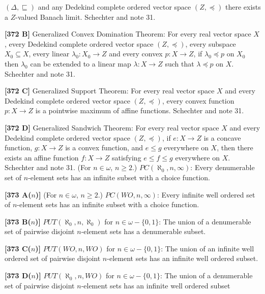 $(\Delta,\sqsubseteq)$ and any Dedekind complete ordered vector
space $(Z,\preccurlyeq)$ there exists a $Z$-valued Banach limit.
\ac{Schechter} \cite{1996b} and note 31.
\smallskip
\item{}{\bf [372 B]} Generalized Convex Domination Theorem:
For every real vector space
$X$, every Dedekind complete ordered vector space $(Z,\preccurlyeq)$,
every subspace $X_0\subseteq X$, every linear $\lambda_0 :X_0\to
Z$ and every convex $p: X\to Z$, if $\lambda_0 \preccurlyeq p$
on $X_0$ then $\lambda_0$ can be extended to a linear map $\lambda:
X\to Z $ such that $\lambda \preccurlyeq p$ on $X$.
\ac{Schechter} \cite{1996b} and note 31. 
\smallskip
\item{}{\bf [372 C]}  Generalized Support Theorem:  For every real
vector space $X$ and every Dedekind complete ordered vector space
$(Z,\preccurlyeq)$, every convex function $p: X\to Z$
is a pointwise maximum of affine functions.  \ac{Schechter} \cite{1996b}
and note 31. 
\smallskip
\item{}{\bf [372 D]} Generalized Sandwich Theorem:  For every real vector
space $X$ and every Dedekind complete ordered vector space
$(Z,\preccurlyeq)$, if $e: X\to Z$ is a concave function,
$g: X\to Z$ is a convex function, and $e\le g$ everywhere
on $X$, then there exists an affine function $f: X \to Z$
satisfying $e \le f \le g$ everywhere on $X$.  \ac{Schechter} \cite{1996b}
and note 31. 
\medskip
{} (For $n\in\omega$, $n\ge 2$.)
$PC(\aleph_0,n,\infty)$: Every denumerable set of $n$-element sets has
an infinite subset with a choice function.
\smallskip
\item{}{\bf [373 A($n$)]} (For $n\in\omega$, $n\ge 2$.)
$PC(WO,n,\infty)$: Every infinite well ordered set of $n$-element sets
has an infinite subset with a choice function.
\smallskip
\item{}{\bf [373 B($n$)]} $PUT(\aleph_0,n,\aleph_0)$ for
$n\in\omega-\{0,1\}$: The union of a denumerable set of pairwise
disjoint $n$-element sets has a denumerable subset.
\smallskip
\item{}{\bf [373 C($n$)]} $PUT(WO,n,WO)$ for $n\in\omega -\{0,1\}$: The
union of an infinite well ordered set of pairwise disjoint $n$-element
sets has an infinite well ordered subset.
\smallskip
\item{}{\bf [373 D($n$)]} $PUT(\aleph_0,n,WO)$ for $n\in\omega
-\{0,1\}$: The union of a denumerable set of pairwise disjoint $n$-element sets has an
infinite well ordered subset
